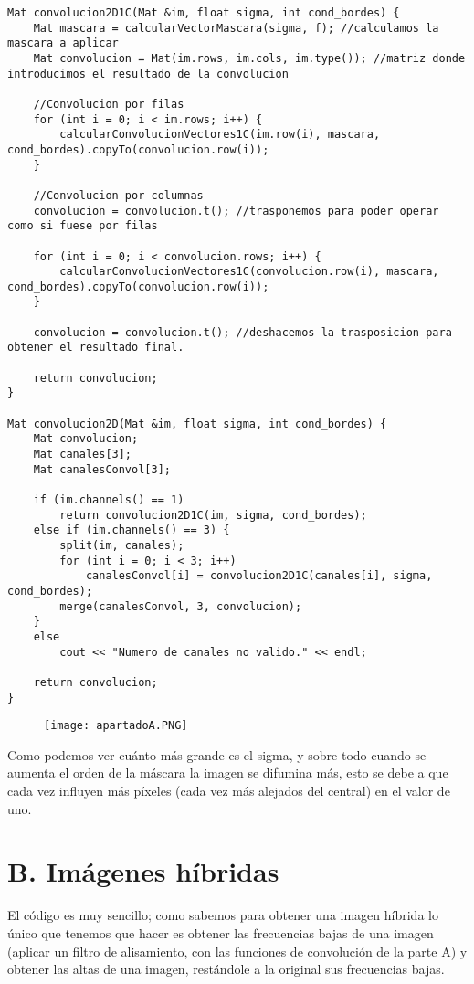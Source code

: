 \documentclass[10pt,a4paper]{article}
\begin{document}
\begin{lstlisting}
Mat convolucion2D1C(Mat &im, float sigma, int cond_bordes) {
	Mat mascara = calcularVectorMascara(sigma, f); //calculamos la mascara a aplicar
	Mat convolucion = Mat(im.rows, im.cols, im.type()); //matriz donde introducimos el resultado de la convolucion

	//Convolucion por filas
	for (int i = 0; i < im.rows; i++) {
		calcularConvolucionVectores1C(im.row(i), mascara, cond_bordes).copyTo(convolucion.row(i));
	}

	//Convolucion por columnas
	convolucion = convolucion.t(); //trasponemos para poder operar como si fuese por filas

	for (int i = 0; i < convolucion.rows; i++) {
		calcularConvolucionVectores1C(convolucion.row(i), mascara, cond_bordes).copyTo(convolucion.row(i));
	}

	convolucion = convolucion.t(); //deshacemos la trasposicion para obtener el resultado final.

	return convolucion;
}

Mat convolucion2D(Mat &im, float sigma, int cond_bordes) {
	Mat convolucion;
	Mat canales[3];
	Mat canalesConvol[3];

	if (im.channels() == 1)
		return convolucion2D1C(im, sigma, cond_bordes);
	else if (im.channels() == 3) {
		split(im, canales);
		for (int i = 0; i < 3; i++)
			canalesConvol[i] = convolucion2D1C(canales[i], sigma, cond_bordes);
		merge(canalesConvol, 3, convolucion);
	}
	else
		cout << "Numero de canales no valido." << endl;

	return convolucion;
}
\end{lstlisting}

\begin{figure}[H]
\centering
\texttt{[image: apartadoA.PNG]}
\end{figure}

Como podemos ver cuánto más grande es el sigma, y sobre todo cuando se aumenta el orden de la máscara la imagen se difumina más, esto se debe a que cada vez influyen más píxeles (cada vez más alejados del central) en el valor de uno.\\

\section*{B. Imágenes híbridas}

El código es muy sencillo; como sabemos para obtener una imagen híbrida lo único que tenemos que hacer es obtener las frecuencias bajas de una imagen (aplicar un filtro de alisamiento, con las funciones de convolución de la parte A) y obtener las altas de una imagen, restándole a la original sus frecuencias bajas.\\
\end{document}
